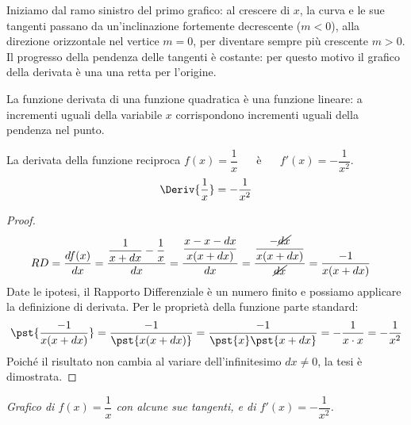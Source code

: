 Iniziamo dal ramo sinistro del primo grafico: al crescere di \(x\), 
la curva e le sue tangenti passano da un'inclinazione fortemente 
decrescente (\(m<0\)), alla direzione orizzontale nel vertice \(m=0\), 
per diventare sempre più crescente \(m>0\).
Il progresso della pendenza delle tangenti è costante: 
per questo motivo il grafico della derivata è una
una retta per l'origine.

\begin{osservazione}
La funzione derivata di una funzione quadratica è una funzione lineare: 
a incrementi uguali della variabile \(x\) corrispondono incrementi uguali
della pendenza nel punto.
\end{osservazione}

\pagebreak %

\begin{teorema}
\label{esem:differenziale_reciproca}
La derivata della funzione reciproca \(f(x)=\dfrac{1}{x}\) ~~ è ~~
\(f'(x) = -\dfrac{1}{x^2}\).
\[\Deriv{\dfrac{1}{x}} = -\dfrac{1}{x^2}\]
\end{teorema}
\begin{proof}
\begin{align*}
 &RD=\dfrac{df(x)}{dx}=\dfrac{\dfrac{1}{x+dx}-\dfrac{1}{x}}{dx}= 
\dfrac{\dfrac{x-x-dx}{x(x+dx)}}{dx}=
\dfrac{\dfrac{-\cancel{dx}}{x(x+dx)}}{\cancel{dx}}=\dfrac{-1}{x(x+dx)}
\end{align*}
Date le ipotesi, il Rapporto Differenziale è un numero finito e 
possiamo applicare la definizione di derivata. 
Per le proprietà della funzione parte standard:
\[ \pst{\dfrac{-1}{x(x+dx)}}=
\dfrac{-1}{\pst{x(x+dx)}}=\dfrac{-1}{\pst{x}\pst{x+dx}}=
      -\dfrac{1}{x\cdot x}=-\dfrac{1}{x^2}\]
Poiché il risultato non cambia al variare dell'infinitesimo \(dx \ne 0\), 
la tesi è dimostrata.
\end{proof}

\begin{inaccessibleblock}
\hspace{-10mm}\affiancati{.49}{.49}{
\scalebox{.8}{\recipr}
}{
\vspace{-2mm}
\scalebox{.8}{\derivatarecipr}
}
\end{inaccessibleblock}
\label{img:diff_reciproca}
\begin{center}
\emph{Grafico di \(f(x)=\dfrac{1}{x}\) con alcune sue tangenti, e 
di \(f'(x) = -\dfrac{1}{x^2}\).} 
\end{center}

